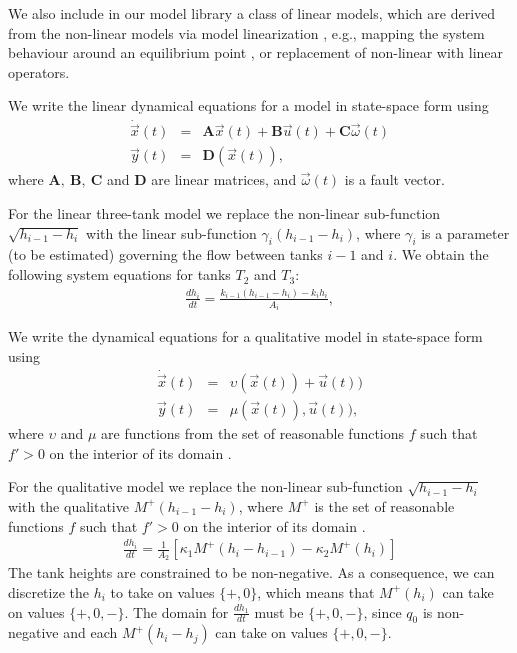 We also include in our model library a class of linear models, which are derived from
the non-linear models via model linearization  \cite{spanos1977linearization}, e.g.,
mapping the system behaviour around an equilibrium point \cite{roubal2010linearization}, or replacement of non-linear with linear operators.


%
\begin{definition}
We write the linear dynamical equations for a model in state-space form using
\begin{eqnarray}\label{eq:linear}
\dot{\vec{x}}(t) & = & \mathbf{A} \vec{x}(t) + \mathbf{B} \vec{u}(t) + \mathbf{C} \vec{\omega}(t)\\ %
\vec{y}(t) & = & \mathbf{D} (\vec{x}(t)),
\end{eqnarray}
where $\mathbf{A}, ~ \mathbf{B},~\mathbf{C}$ and $\mathbf{D}$ are linear matrices, and
$\vec{\omega}(t)$ is a fault vector.
\end{definition}
%
For the linear three-tank model we replace the non-linear sub-function
$\sqrt{h_{i - 1} - h_i}$ with the linear sub-function $\gamma_i (h_{i
- 1} - h_i)$, where $\gamma_i$ is a parameter (to be estimated)
governing the flow between tanks $i - 1$ and $i$. We obtain the
following system equations for tanks $T_2$ and $T_3$:
%
\begin{eqnarray}\label{eq:lineartank}
%
\frac{d h_i}{dt} = \frac{k_{i - 1}(h_{i - 1} - h_{i}) - k_i {h_i}}{A_i},
%
\end{eqnarray}
%
\begin{definition}
We write the dynamical equations for a qualitative model in state-space form using
\begin{eqnarray}\label{qual-model}
\dot{\vec{x}}(t) & = & \upsilon (\vec{x}(t)) + \vec{u}(t))\\
\vec{y}(t) & = & \mu (\vec{x}(t)), \vec{u}(t)),
\end{eqnarray}
where $\upsilon$ and $\mu$ are functions from the set of reasonable
functions $f$ such that $f' > 0$ on the interior of its domain
\citep{kuipers1994composition}.
\end{definition}
%
For the qualitative model we replace the non-linear sub-function
$\sqrt{h_{i - 1} - h_i}$ with the qualitative $M^+(h_{i - 1} - h_i)$,
where $M^+$ is the set of reasonable functions $f$ such that $f' > 0$
on the interior of its domain
\citep{kuipers1994composition}.
%
\begin{eqnarray}
%
\frac{d h_i}{dt} = \frac{1}{A_2}\left[\kappa_{1} M^+(h_{i} - h_{i - 1}) - \kappa_2 M^+(h_i)\right]
%
\end{eqnarray}
%
The tank heights are constrained to be non-negative. As a consequence,
we can discretize the $h_i$ to take on values $\{+, 0\}$, which means
that $M^+(h_i)$ can take on values $\{+, 0, -\}$.  The domain for
$\frac{d h_1}{dt}$ must be $\{+, 0, -\}$, since $q_0$ is non-negative
and each $M^+(h_i - h_j)$ can take on values $\{+, 0, -\}$.


